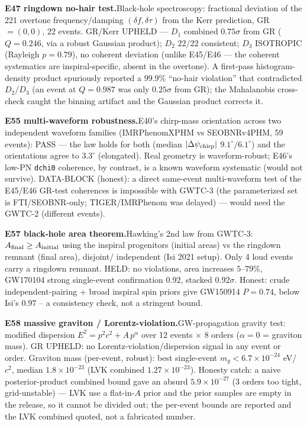 \documentclass[10pt]{article}
\newcommand{\entry}[2]{\vspace{5pt}\noindent\textbf{#1}\quad #2\par}
\begin{document}
\entry{E47 ringdown no-hair test.}{Black-hole spectroscopy: fractional deviation of the 221
overtone frequency/damping $(\delta f,\delta\tau)$ from the Kerr prediction, GR $=(0,0)$, 22 events.
GR/Kerr UPHELD --- $D_1$ combined $0.75\sigma$ from GR ($Q=0.246$, via a robust Gaussian product);
$D_2$ $22/22$ consistent; $D_3$ ISOTROPIC (Rayleigh $p=0.79$), no coherent deviation (unlike
E45/E46 --- the coherent systematics are inspiral-specific, absent in the overtone). A first-pass
histogram-density product spuriously reported a $99.9\%$ ``no-hair violation'' that contradicted
$D_2/D_3$ (an event at $Q{=}0.987$ was only $0.25\sigma$ from GR); the Mahalanobis cross-check
caught the binning artifact and the Gaussian product corrects it.}

\entry{E55 multi-waveform robustness.}{E40's chirp-mass orientation across two independent waveform
families (IMRPhenomXPHM vs SEOBNRv4PHM, 59 events): PASS --- the law holds for both (median
$|\Delta\psi_{\rm chirp}|$ $9.1^\circ/6.1^\circ$) and the orientations agree to $3.3^\circ$
(elongated). Real geometry is waveform-robust; E46's low-PN \texttt{dchi0} coherence, by contrast,
is a known waveform systematic (would not survive). DATA-BLOCK (honest): a direct same-event
multi-waveform test of the E45/E46 GR-test coherences is impossible with GWTC-3 (the parameterized
set is FTI/SEOBNR-only; TIGER/IMRPhenom was delayed) --- would need the GWTC-2 (different events).}

\entry{E57 black-hole area theorem.}{Hawking's 2nd law from GWTC-3: $A_{\rm final}\ge A_{\rm initial}$
using the inspiral progenitors (initial areas) vs the ringdown remnant (final area), disjoint/
independent (Isi 2021 setup). Only 4 loud events carry a ringdown remnant. HELD: no violations, area
increases $5$--$79\%$, GW170104 strong single-event confirmation $0.92$, stacked $0.92\sigma$. Honest:
crude independent-pairing + broad inspiral spin priors give GW150914 $P{=}0.74$, below Isi's $0.97$ --
a consistency check, not a stringent bound.}

\entry{E58 massive graviton / Lorentz-violation.}{GW-propagation gravity test: modified dispersion
$E^2=p^2c^2+A\,p^\alpha$ over 12 events $\times$ 8 orders ($\alpha{=}0$ = graviton mass). GR UPHELD:
no Lorentz-violation/dispersion signal in any event or order. Graviton mass (per-event, robust): best
single-event $m_g < 6.7\times10^{-24}$ eV/$c^2$, median $1.8\times10^{-23}$ (LVK combined $1.27\times
10^{-23}$). Honesty catch: a naive posterior-product combined bound gave an absurd $5.9\times10^{-27}$
(3 orders too tight, grid-unstable) --- LVK use a flat-in-$A$ prior and the prior samples are empty in
the release, so it cannot be divided out; the per-event bounds are reported and the LVK combined quoted,
not a fabricated number.}
\end{document}
